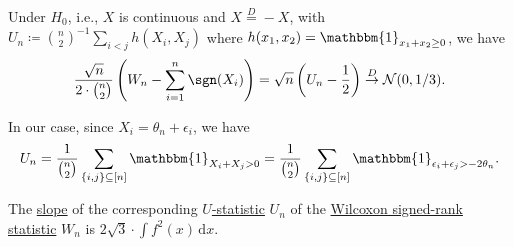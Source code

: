 \begin{prev}
	Under \(H_0\), i.e., \(X\) is continuous and \(X \overset{D}{=} -X\), with \(U_n \coloneqq \binom{n}{2}^{-1} \sum_{i < j} h(X_i, X_j)\) where \(h(x_1, x_2) = \mathbbm{1}_{x_1 + x_2 \geq 0} \), we have
	\[
		\frac{\sqrt{n}}{2\cdot \binom{n}{2}}  \left( W_n - \sum_{i=1}^{n} \sgn (X_i) \right)
		= \sqrt{n} \left( U_n - \frac{1}{2} \right)
		\overset{D}{\to} \mathcal{N} (0, 1 / 3).
	\]
\end{prev}

In our case, since \(X_i = \theta _n + \epsilon _i\), we have
\[
	U_n
	= \frac{1}{\binom{n}{2}} \sum_{\{ i, j \} \subseteq [n]} \mathbbm{1}_{X_i + X_j > 0}
	= \frac{1}{\binom{n}{2}} \sum_{\{ i, j \} \subseteq [n]} \mathbbm{1}_{\epsilon _i + \epsilon _j > - 2 \theta _n}.
\]

\begin{eg}
	The \hyperref[def:slope]{slope} of the corresponding \hyperref[def:U-statistic]{\(U\)-statistic} \(U_n\) of the \hyperref[def:Wilcoxon-signed-rank-statistic]{Wilcoxon signed-rank statistic} \(W_n\) is \(2 \sqrt{3} \cdot \int f^2(x) \,\mathrm{d} x\).
\end{eg}

